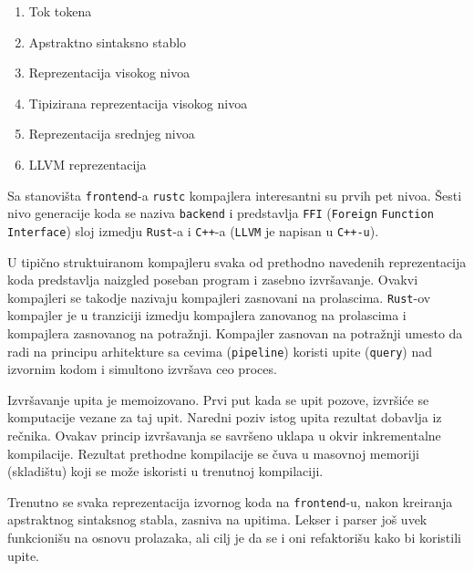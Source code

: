 \documentclass[11pt]{article}
\begin{document}
\begin{enumerate}    
    \item Tok tokena
    \item Apstraktno sintaksno stablo
    \item Reprezentacija visokog nivoa
    \item Tipizirana reprezentacija visokog nivoa
    \item Reprezentacija srednjeg nivoa
    \item LLVM reprezentacija
\end{enumerate}
Sa stanovišta \verb|frontend|-a \verb|rustc| kompajlera interesantni su prvih pet nivoa. Šesti nivo generacije 
koda se naziva \verb|backend| i predstavlja \verb|FFI| (\verb|Foreign| \verb|Function| \verb|Interface|) sloj izmedju \verb|Rust|-a i \verb|C++|-a
(\verb|LLVM| je napisan u \verb|C++-u|). 

U tipično struktuiranom kompajleru svaka od prethodno navedenih reprezentacija koda predstavlja 
naizgled poseban program i zasebno izvršavanje. Ovakvi kompajleri se takodje nazivaju 
kompajleri zasnovani na prolascima. \verb|Rust|-ov kompajler je u tranziciji izmedju 
kompajlera zanovanog na prolascima i kompajlera zasnovanog na potražnji. Kompajler 
zasnovan na potražnji umesto da radi na principu arhitekture sa cevima (\verb|pipeline|)
koristi upite (\verb|query|) nad izvornim kodom i simultono izvršava ceo proces.

Izvršavanje upita je memoizovano. Prvi put kada se upit pozove, izvršiće se komputacije 
vezane za taj upit. Naredni poziv istog upita rezultat dobavlja iz rečnika.
Ovakav princip izvršavanja se savršeno uklapa u okvir inkrementalne kompilacije. 
Rezultat prethodne kompilacije se čuva u masovnoj memoriji (skladištu) koji se može iskoristi
u trenutnoj kompilaciji.

Trenutno se svaka reprezentacija izvornog koda na \verb|frontend|-u, 
nakon kreiranja apstraktnog sintaksnog stabla, zasniva na upitima. 
Lekser i parser još uvek funkcionišu na osnovu prolazaka, 
ali cilj je da se i oni refaktorišu kako bi koristili upite.
\end{document}
